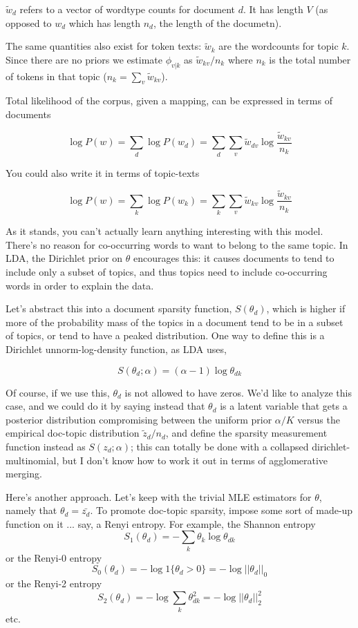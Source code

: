 \documentclass[11pt,letterpaper]{article}
\newcommand{\til}[1]{\widetilde{#1}}
\theoremstyle{definition}
\begin{document}
$\til{w}_d$ refers to a vector of wordtype counts for document $d$.  It has length $V$ (as opposed to $w_d$ which has length $n_d$, the length of the documetn).  %

The same quantities also exist for token texts: $\til{w}_k$ are the wordcounts for topic $k$.  Since there are no priors we estimate $\phi_{v|k}$ as $\til{w}_{kv}/n_k$ where $n_k$ is the total number of tokens in that topic ($n_k=\sum_v \til{w}_{kv}$).

Total likelihood of the corpus, given a mapping, can be expressed in terms of documents

\[ \log P(w) = \sum_d \log P(w_d) = \sum_d \sum_v \til{w}_{dv} \log \frac{\til{w}_{kv}}{n_k} \]

You could also write it in terms of topic-texts

\[ \log P(w) = \sum_k \log P(w_k) = \sum_k \sum_v \til{w}_{kv} \log \frac{\til{w}_{kv}}{n_k} \]

As it stands, you can't actually learn anything interesting with this model.  There's no reason for co-occurring words to want to belong to the same topic.
In LDA, the Dirichlet prior on $\theta$ encourages this: it causes documents to tend to include only a subset of topics, and thus topics need to include co-occurring words in order to explain the data.

Let's abstract this into a document sparsity function, $S(\theta_d)$, which is higher if more of the probability mass of the topics in a document tend to be in a subset of topics, or tend to have a peaked distribution.  One way to define this is a Dirichlet unnorm-log-density function, as LDA uses,

\[ S(\theta_d; \alpha) = \left(\alpha - 1\right) \log \theta_{dk} \]

Of course, if we use this, $\theta_d$ is not allowed to have zeros.  We'd like to analyze this case, and we could do it by saying instead that $\theta_d$ is a latent variable that gets a posterior distribution compromising between the uniform prior $\alpha/K$ versus the empirical doc-topic distribution $\til{z}_d/n_d$, and define the sparsity measurement function instead as $S(z_d;\alpha)$; this can totally be done with a collapsed dirichlet-multinomial, but I don't know how to work it out in terms of agglomerative merging.

Here's another approach.  Let's keep with the trivial MLE estimators for $\theta$, namely that $\theta_d=\bar{z_d}$.  To promote doc-topic sparsity, impose some sort of made-up function on it ... say, a Renyi entropy.  For example, the Shannon entropy 
\[ S_1(\theta_d) = -\sum_k \theta_k \log \theta_{dk} \]
or the Renyi-0 entropy
\[ S_0(\theta_d) = -\log 1\{\theta_d>0\} = -\log ||\theta_d||_0\]
or the Renyi-2 entropy
\[ S_2(\theta_d) = -\log \sum_k \theta_{dk}^2 = -\log ||\theta_d||^2_2 \]
etc.
\end{document}
